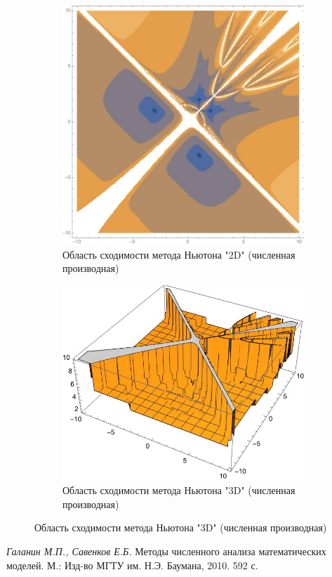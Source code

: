 \documentclass[12pt, a4paper]{article}
\begin{document}
\begin{figure}[H]
	\centering
	\begin{subfigure}{0.45\textwidth}
		\includegraphics[width=\textwidth]{2D5ch}
		\caption{Область сходимости метода Ньютона "2D" (численная производная)}
	\end{subfigure}
	\hfill
	\begin{subfigure}{0.45\textwidth}
		\includegraphics[width=\textwidth]{3D5ch}
		\caption{Область сходимости метода Ньютона "3D" (численная производная)}
	\end{subfigure}
\end{figure}
	
	
	\newpage
	\begin{thebibliography}{1}
		 \textit{Галанин М.П., Савенков Е.Б.} Методы численного анализа математических\\ моделей. М.: Изд-во МГТУ им. Н.Э. Баумана,	2010. 592 с.
		
		
	\end{thebibliography}
	
	
\end{document}
